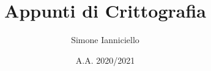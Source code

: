 \documentclass[a4paper,11pt,twoside]{book}
\begin{document}
\title{Appunti di Crittografia}
\author{Simone Ianniciello}
\date{A.A. 2020/2021}
\maketitle

\tableofcontents


\end{document}
